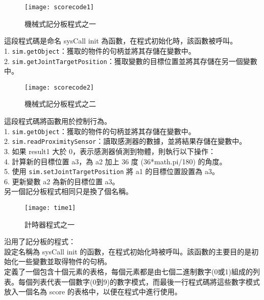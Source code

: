\begin{figure}[hbt!]
\begin{center}
\texttt{[image: scorecode1]}
\caption{\Large 機械式記分板程式之一}\label{機械式記分板程式之一}
\end{center}
\end{figure} 
這段程式碼是命名 sysCall init 為函數，在程式初始化時，該函數被呼叫。\\
1. \texttt{sim.getObject}：獲取的物件的句柄並將其存儲在變數中。\\
2. \texttt{sim.getJointTargetPosition}：獲取變數的目標位置並將其存儲在另一個變數中。\\
\newpage

\begin{figure}[hbt!]
\begin{center}
\texttt{[image: scorecode2]}
\caption{\Large 機械式記分板程式之二}\label{機械式記分板程式之二}
\end{center}
\end{figure} 
這段程式碼將函數用於控制行為。\\
1. \texttt{sim.getObject}：獲取的物件的句柄並將其存儲在變數中。\\
2. \texttt{sim.readProximitySensor}：讀取感測器的數據，並將結果存儲在變數中。\\
3. 如果 result1 大於 0，表示感測器偵測到物體，則執行以下操作：\\
4. 計算新的目標位置 a3，為 a2 加上 36 度 (36*math.pi/180) 的角度。\\
5. 使用 \texttt{sim.setJointTargetPosition} 將 a1 的目標位置設置為 a3。\\
6. 更新變數 a2 為新的目標位置 a3。\\
另一個記分板程式相同只是換了個名稱。\\
\newpage

\begin{figure}[hbt!]
\begin{center}
\texttt{[image: time1]}
\caption{\Large 計時器程式之一}\label{計時器程式之一}
\end{center}
\end{figure} 
沿用了記分板的程式：\\
設定名稱為 sysCall init 的函數，在程式初始化時被呼叫。該函數的主要目的是初始化一些變數並取得物件的句柄。\\定義了一個包含十個元素的表格，每個元素都是由七個二進制數字(0或1)組成的列表。每個列表代表一個數字(0到9)的數字模式，而最後一行程式碼將這些數字模式放入一個名為 score 的表格中，以便在程式中進行使用。\\
\newpage

